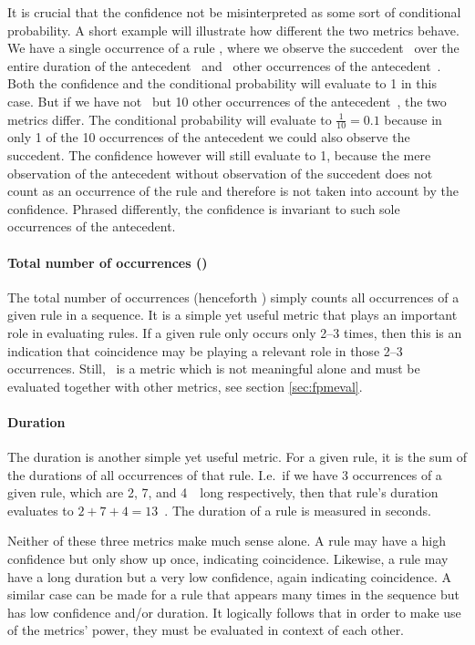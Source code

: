 It is crucial that the confidence not be misinterpreted as some sort of conditional probability.
A short example will illustrate how different the two metrics behave.
We have a single occurrence of a rule , where we observe the succedent~ over the entire duration of the antecedent~ and \zero\ other occurrences of the antecedent~.
Both the confidence and the conditional probability will evaluate to 1 in this case.
But if we have not \zero\ but 10 other occurrences of the antecedent~, the two metrics differ.
The conditional probability will evaluate to \(\frac{1}{10} = 0.1\) because in only 1 of the 10 occurrences of the antecedent we could also observe the succedent.
The confidence however will still evaluate to 1, because the mere observation of the antecedent without observation of the succedent does not count as an occurrence of the rule  and therefore is not taken into account by the confidence.
Phrased differently, the confidence is invariant to such sole occurrences of the antecedent.

\paragraph{Total number of occurrences (\noc)}
The total number of occurrences (henceforth \noc) simply counts all occurrences of a given rule in a sequence.
It is a simple yet useful metric that plays an important role in evaluating rules.
If a given rule only occurs only 2--3 times, then this is an indication that coincidence may be playing a relevant role in those 2--3 occurrences.
Still, \noc\ is a metric which is not meaningful alone and must be evaluated together with other metrics, see section \ref{sec:fpmeval}.

\paragraph{Duration}
The duration is another simple yet useful metric.
For a given rule, it is the sum of the durations of all occurrences of that rule.
I.e.~if we have 3 occurrences of a given rule, which are 2, 7, and 4~\s\ long respectively, then that rule's duration evaluates to \(2+7+4=13\)~\s.
The duration of a rule is measured in seconds.

Neither of these three metrics make much sense alone.
A rule may have a high confidence but only show up once, indicating coincidence.
Likewise, a rule may have a long duration but a very low confidence, again indicating coincidence.
A similar case can be made for a rule that appears many times in the sequence but has low confidence and/or duration.
It logically follows that in order to make use of the metrics' power, they must be evaluated in context of each other.


